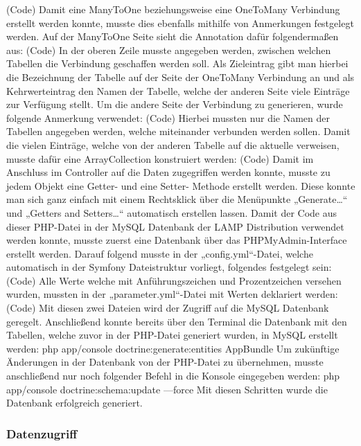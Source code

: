 (Code)
Damit eine ManyToOne beziehungsweise eine OneToMany Verbindung erstellt werden konnte, musste dies ebenfalls mithilfe von Anmerkungen festgelegt werden. 
Auf der ManyToOne Seite sieht die Annotation dafür folgendermaßen aus:
(Code)
In der oberen Zeile musste angegeben werden, zwischen welchen Tabellen die Verbindung geschaffen werden soll. Als Zieleintrag gibt man hierbei die Bezeichnung der Tabelle auf der Seite der OneToMany Verbindung an und als Kehrwerteintrag den Namen der Tabelle, welche der anderen Seite viele Einträge zur Verfügung stellt. 
Um die andere Seite der Verbindung zu generieren, wurde folgende Anmerkung verwendet:
(Code)
Hierbei mussten nur die Namen der Tabellen angegeben werden, welche miteinander verbunden werden sollen. Damit die vielen Einträge, welche von der anderen Tabelle auf die aktuelle verweisen, musste dafür eine ArrayCollection konstruiert werden:
(Code)
Damit im Anschluss im Controller auf die Daten zugegriffen werden konnte, musste zu jedem Objekt eine Getter- und eine Setter- Methode erstellt werden. Diese konnte man sich ganz einfach mit einem Rechtsklick über die Menüpunkte „Generate…“ und „Getters and Setters…“ automatisch erstellen lassen.
Damit der Code aus dieser PHP-Datei in der MySQL Datenbank der LAMP Distribution verwendet werden konnte, musste zuerst eine Datenbank über das PHPMyAdmin-Interface erstellt werden. Darauf folgend musste in der „config.yml“-Datei, welche automatisch in der Symfony Dateistruktur vorliegt, folgendes festgelegt sein: 
(Code)
Alle Werte welche mit Anführungszeichen und Prozentzeichen versehen wurden, mussten in der „parameter.yml“-Datei mit Werten deklariert werden:
(Code)
Mit diesen zwei Dateien wird der Zugriff auf die MySQL Datenbank geregelt.
Anschließend konnte bereits über den Terminal die Datenbank mit den Tabellen, welche zuvor in der PHP-Datei generiert wurden, in MySQL erstellt werden:
php app/console doctrine:generate:entities AppBundle
Um zukünftige Änderungen in der Datenbank von der PHP-Datei zu übernehmen, musste anschließend nur noch folgender Befehl in die Konsole eingegeben werden:
php app/console doctrine:schema:update —force
Mit diesen Schritten wurde die Datenbank erfolgreich generiert.

    \subsubsection{Datenzugriff}


